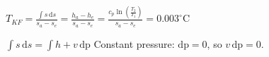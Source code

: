 \( T_{KF} = \frac{\int s \, \text{d}s}{s_a - s_e} = \frac{h_a - h_e}{s_a - s_e} = \frac{c_p \ln \left( \frac{T_2}{T_1} \right)}{s_a - s_e} = 0.003^\circ \text{C} \)  

\( \int s \, \text{d}s = \int h + v \, \text{dp} \)  
Constant pressure: \( \text{dp} = 0 \), so \( v \, \text{dp} = 0 \).
